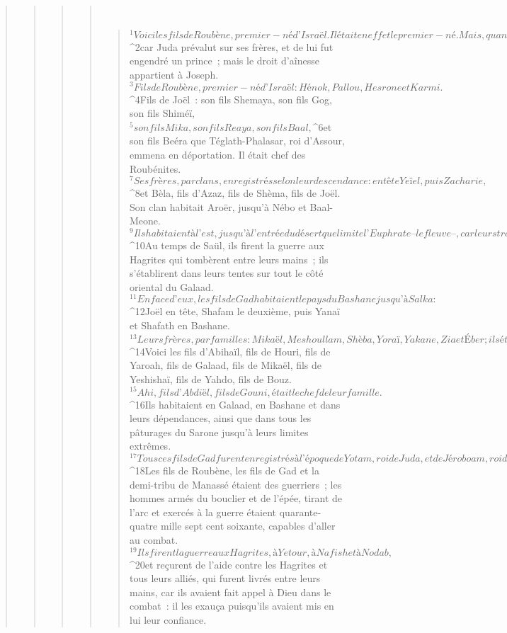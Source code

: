 \begin{verse}
\begin{verse}
\begin{verse}
\begin{verse}
         
      \bchapter{}
      \begin{verse}
${}^{1}Voici les fils de Roubène, premier-né d’Israël. Il était en effet le premier-né. Mais, quand il eut profané la couche de son père, son droit d’aînesse fut donné aux fils de Joseph, fils d’Israël, sans que ce droit soit enregistré, 
${}^{2}car Juda prévalut sur ses frères, et de lui fut engendré un prince ; mais le droit d’aînesse appartient à Joseph.
${}^{3}Fils de Roubène, premier-né d’Israël : Hénok, Pallou, Hesrone et Karmi.
${}^{4}Fils de Joël : son fils Shemaya, son fils Gog, son fils Shiméï, 
${}^{5}son fils Mika, son fils Reaya, son fils Baal, 
${}^{6}et son fils Beéra que Téglath-Phalasar, roi d’Assour, emmena en déportation. Il était chef des Roubénites. 
${}^{7}Ses frères, par clans, enregistrés selon leur descendance : en tête Yeïel, puis Zacharie, 
${}^{8}et Bèla, fils d’Azaz, fils de Shèma, fils de Joël. Son clan habitait Aroër, jusqu’à Nébo et Baal-Meone. 
${}^{9}Ils habitaient à l’est, jusqu’à l’entrée du désert que limite l’Euphrate – le fleuve –, car leurs troupeaux s’étaient multipliés au pays de Galaad. 
${}^{10}Au temps de Saül, ils firent la guerre aux Hagrites qui tombèrent entre leurs mains ; ils s’établirent dans leurs tentes sur tout le côté oriental du Galaad.
${}^{11}En face d’eux, les fils de Gad habitaient le pays du Bashane jusqu’à Salka : 
${}^{12}Joël en tête, Shafam le deuxième, puis Yanaï et Shafath en Bashane. 
${}^{13}Leurs frères, par familles : Mikaël, Meshoullam, Shèba, Yoraï, Yakane, Zia et Éber ; ils étaient sept. 
${}^{14}Voici les fils d’Abihaïl, fils de Houri, fils de Yaroah, fils de Galaad, fils de Mikaël, fils de Yeshishaï, fils de Yahdo, fils de Bouz. 
${}^{15}Ahi, fils d’Abdiël, fils de Gouni, était le chef de leur famille. 
${}^{16}Ils habitaient en Galaad, en Bashane et dans leurs dépendances, ainsi que dans tous les pâturages du Sarone jusqu’à leurs limites extrêmes.
${}^{17}Tous ces fils de Gad furent enregistrés à l’époque de Yotam, roi de Juda, et de Jéroboam, roi d’Israël.
${}^{18}Les fils de Roubène, les fils de Gad et la demi-tribu de Manassé étaient des guerriers ; les hommes armés du bouclier et de l’épée, tirant de l’arc et exercés à la guerre étaient quarante-quatre mille sept cent soixante, capables d’aller au combat. 
${}^{19}Ils firent la guerre aux Hagrites, à Yetour, à Nafish et à Nodab, 
${}^{20}et reçurent de l’aide contre les Hagrites et tous leurs alliés, qui furent livrés entre leurs mains, car ils avaient fait appel à Dieu dans le combat : il les exauça puisqu’ils avaient mis en lui leur confiance. 

\end{verse}
\end{verse}
\end{verse}
\end{verse}
\end{verse}
